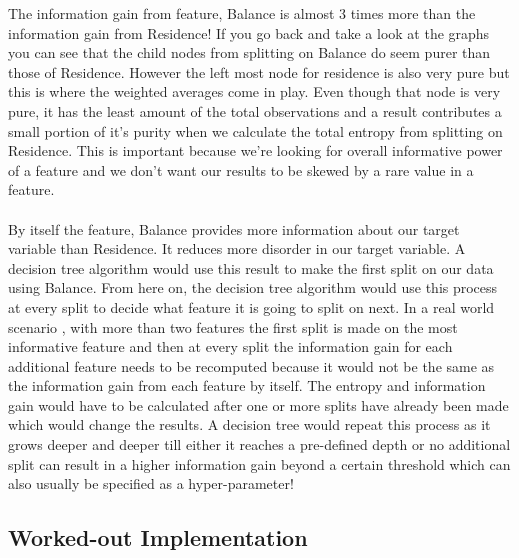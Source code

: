 	The information gain from feature, Balance is almost 3 times more than the information gain from Residence! If you go back and take a look at the graphs you can see that the child nodes from splitting on Balance do seem purer than those of Residence. However the left most node for residence is also very pure but this is where the weighted averages come in play. Even though that node is very pure, it has the least amount of the total observations and a result contributes a small portion of it’s purity when we calculate the total entropy from splitting on Residence. This is important because we’re looking for overall informative power of a feature and we don’t want our results to be skewed by a rare value in a feature.
	\\ \\
	By itself the feature, Balance provides more information about our target variable than Residence. It reduces more disorder in our target variable. A decision tree algorithm would use this result to make the first split on our data using Balance. From here on, the decision tree algorithm would use this process at every split to decide what feature it is going to split on next. In a real world scenario , with more than two features the first split is made on the most informative feature and then at every split the information gain for each additional feature needs to be recomputed because it would not be the same as the information gain from each feature by itself. The entropy and information gain would have to be calculated after one or more splits have already been made which would change the results. A decision tree would repeat this process as it grows deeper and deeper till either it reaches a pre-defined depth or no additional split can result in a higher information gain beyond a certain threshold which can also usually be specified as a hyper-parameter!
	\\

\subsection*{Worked-out Implementation}

